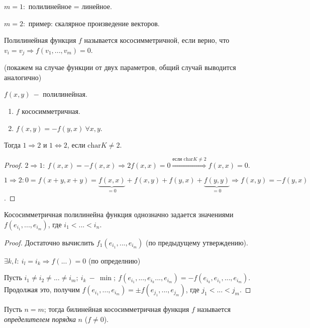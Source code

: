 \begin{example}
    $m=1:$ полилинейное = линейное.

    $m=2:$ пример: скалярное произведение векторов.
\end{example}

\begin{definition}
    Полилинейная функция $f$ называется кососимметричной, если верно, что $v_i=v_j\Rightarrow f(v_1,..., v_m)=0$.
\end{definition}

\begin{remark} (покажем на случае функции от двух параметров, общий случай выводится аналогично)

    $f(x, y)\ -$ полилинейная.
    \begin{enumerate}
        \item $f$ кососимметричная.
        \item $f(x,y)=-f(y,x)\ \forall x, y$.
    \end{enumerate}
    Тогда $1\Rightarrow 2$ и $1\Leftrightarrow 2$, если $\text{char} K\neq 2$.
\end{remark}

\begin{proof}
    $2\Rightarrow 1:\ f(x,x)=-f(x,x)\Rightarrow 2f(x,x)=0\overset{\text{если char} K\neq 2}{\Rightarrow} f(x,x)=0$.

    $1\Rightarrow 2: 0=f(x+y, x+y)=\underbrace{f(x,x)}_{=0}+f(x,y)+f(y,x)+\underbrace{f(y,y)}_{=0}\Rightarrow f(x,y)=-f(y,x)$.
\end{proof}

\begin{statement}
    Кососимметричная полилинейна функция однозначно задается значениями $f(e_{i_1},...,e_{i_m})$, где $i_1<...<i_n$.
\end{statement}

\begin{proof}
    Достаточно вычислить $f_1(e_{i_1},...,e_{i_m})$ (по предыдущему утверждению).

    $\exists k,l:\ i_l=i_k\Rightarrow f(...)=0$ (по определнию)

    Пусть $i_1\neq i_2\neq ... \neq i_m;\ i_k\ -\ \min;\ f(e_{i_1},...,e_{i_k}...,e_{i_m})=-f(e_{i_k}, e_{i_1},...,e_{i_m})$. Продолжая это, получим $f(e_{i_1},...,e_{i_m})=\pm f(e_{j_1},...,e_{j_m})$, где $j_1<...<j_m$.
\end{proof}

\begin{definition}
    Пусть $n=m$; тогда билинейная кососимметричная функция $f$ называется \textit{определителем порядка} $n$ ($f\neq 0$).
\end{definition}

